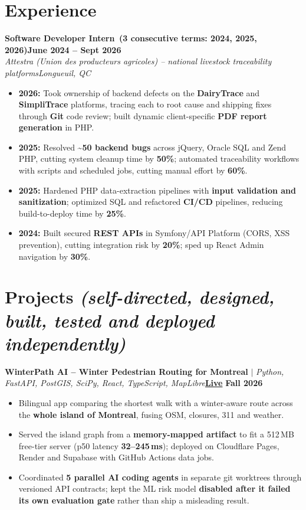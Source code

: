 \documentclass[letterpaper,9pt]{extarticle}
\newcommand{\entry}[4]{%
  \vspace{1.5pt}\noindent\textbf{#1}\hfill\textbf{#2}\\[-1pt]
  \noindent\textit{#3}\hfill\textit{#4}\par\vspace{-1pt}}
\newcommand{\project}[3]{%
  \vspace{1.5pt}\noindent\textbf{#1} $|$ \textit{#2}\hfill#3\par\vspace{-1pt}}
\begin{document}
\section{Experience}
\entry{Software Developer Intern \,(3 consecutive terms: 2024, 2025, 2026)}{June 2024 -- Sept 2026}{Attestra (Union des producteurs agricoles) -- national livestock traceability platforms}{Longueuil, QC}
\begin{itemize}
  \item \textbf{2026:} Took ownership of backend defects on the \textbf{DairyTrace} and \textbf{SimpliTrace} platforms, tracing each to root cause and shipping fixes through \textbf{Git} code review; built dynamic client-specific \textbf{PDF report generation} in PHP.
  \item \textbf{2025:} Resolved \textbf{\textasciitilde50 backend bugs} across jQuery, Oracle SQL and Zend PHP, cutting system cleanup time by \textbf{50\%}; automated traceability workflows with scripts and scheduled jobs, cutting manual effort by \textbf{60\%}.
  \item \textbf{2025:} Hardened PHP data-extraction pipelines with \textbf{input validation and sanitization}; optimized SQL and refactored \textbf{CI/CD} pipelines, reducing build-to-deploy time by \textbf{25\%}.
  \item \textbf{2024:} Built secured \textbf{REST APIs} in Symfony/API Platform (CORS, XSS prevention), cutting integration risk by \textbf{20\%}; sped up React Admin navigation by \textbf{30\%}.
\end{itemize}

\section{Projects \normalfont\textit{\small(self-directed, designed, built, tested and deployed independently)}}
\project{WinterPath AI -- Winter Pedestrian Routing for Montreal}{Python, FastAPI, PostGIS, SciPy, React, TypeScript, MapLibre}{\href{https://winterpath.pages.dev}{\textbf{Live}} \textbf{Fall 2026}}
\begin{itemize}
  \item Bilingual app comparing the shortest walk with a winter-aware route across the \textbf{whole island of Montreal}, fusing OSM, closures, 311 and weather.
  \item Served the island graph from a \textbf{memory-mapped artifact} to fit a 512\,MB free-tier server (p50 latency \textbf{32--245\,ms}); deployed on Cloudflare Pages, Render and Supabase with GitHub Actions data jobs.
  \item Coordinated \textbf{5 parallel AI coding agents} in separate git worktrees through versioned API contracts; kept the ML risk model \textbf{disabled after it failed its own evaluation gate} rather than ship a misleading result.
\end{itemize}
\end{document}
